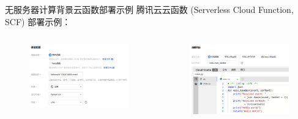 \documentclass[aspectratio=169]{beamer}
\begin{document}
\begin{frame}{无服务器计算背景}{云函数部署示例}
  腾讯云云函数 (Serverless Cloud Function, SCF) 部署示例：
  \begin{columns}
    \begin{figure}
      \centering
      \includegraphics[width=\textwidth]{img/serverless-background/scf-deploy-1.png}
    \end{figure}

    \begin{figure}
      \centering
      \includegraphics[width=\textwidth]{img/serverless-background/scf-deploy-2.png}
    \end{figure}
  \end{columns}
\end{frame}
\end{document}
